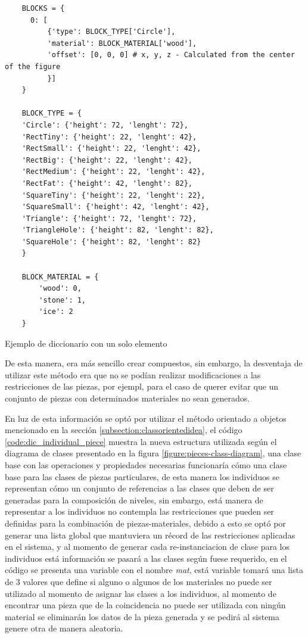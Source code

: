 \begin{listing}[t]
  \begin{verbatim}
    BLOCKS = {
      0: [
          {'type': BLOCK_TYPE['Circle'],
          'material': BLOCK_MATERIAL['wood'],
          'offset': [0, 0, 0] # x, y, z - Calculated from the center of the figure
          }]
    }

    BLOCK_TYPE = {
    'Circle': {'height': 72, 'lenght': 72},
    'RectTiny': {'height': 22, 'lenght': 42},
    'RectSmall': {'height': 22, 'lenght': 42},
    'RectBig': {'height': 22, 'lenght': 42},
    'RectMedium': {'height': 22, 'lenght': 42},
    'RectFat': {'height': 42, 'lenght': 82},
    'SquareTiny': {'height': 22, 'lenght': 22},
    'SquareSmall': {'height': 42, 'lenght': 42},
    'Triangle': {'height': 72, 'lenght': 72},
    'TriangleHole': {'height': 82, 'lenght': 82},
    'SquareHole': {'height': 82, 'lenght': 82}
    }

    BLOCK_MATERIAL = {
        'wood': 0,
        'stone': 1,
        'ice': 2
    }
  \end{verbatim}
  \caption{Ejemplo de diccionario con un solo elemento}
  \label{code:dic_individual_piece}
\end{listing}

De esta manera, era más sencillo crear compuestos,
sin embargo, la desventaja de utilizar este método era que no se podían
realizar modificaciones a las restricciones de las piezas, por ejempl, para el caso de
querer evitar que un conjunto de piezas con determinados materiales no sean
generados.

En luz de esta información se optó por utilizar el método orientado a objetos
mencionado en la sección \ref{subsection:classorientedidea}, el código
\ref{code:dic_individual_piece} muestra la nueva estructura utilizada según el
diagrama de clases presentado en la figura \ref{figure:pieces-class-diagram},
una clase base con las operaciones y
propiedades necesarias funcionaría cómo una clase base para las clases
de piezas particulares, de esta manera los individuos se representan cómo un
conjunto de referencias a las clases que deben de ser generadas para la
composición de niveles, sin embargo, está manera de representar a los individuos
no contempla las restricciones que pueden ser definidas para la combinación de
piezas-materiales, debido a esto se optó por generar una lista global que
mantuviera un récord de las restricciones aplicadas en el sistema, y al momento
de generar cada re-instanciacion de clase para los individuos está información se
pasará a las clases según fuese requerido, en el código se presenta una variable
con el nombre \textit{mat}, está variable tomará una lista de 3 valores que
define si alguno o algunos de los materiales no puede ser utilizado al momento
de asignar las clases a los individuos, al momento de encontrar una pieza que de
la coincidencia no puede ser utilizada con ningún material se eliminarán los
datos de la pieza generada y se pedirá al sistema genere otra de manera aleatoria.

